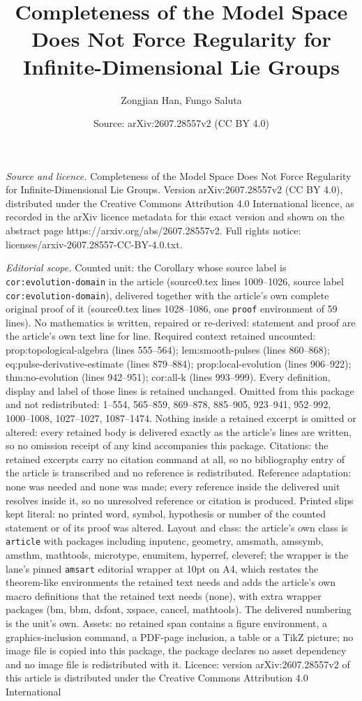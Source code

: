 \documentclass[10pt,a4paper]{amsart}
\title[Completeness of the Model Space Does Not Force Regularity fo]{Completeness of the Model Space Does Not Force Regularity for Infinite-Dimensional Lie Groups}
\author{Zongjian Han, Fungo Saluta}
\date{Source: arXiv:2607.28557v2 (CC BY 4.0)}
\begin{document}
\maketitle

\noindent\emph{Source and licence.} Completeness of the Model Space Does Not Force Regularity for Infinite-Dimensional Lie Groups. Version arXiv:2607.28557v2 (CC BY 4.0), distributed under the Creative Commons Attribution 4.0 International licence, as recorded in the arXiv licence metadata for this exact version and shown on the abstract page https://arxiv.org/abs/2607.28557v2. Full rights notice: licenses/arxiv-2607.28557-CC-BY-4.0.txt.\par\smallskip

\noindent\textit{Editorial scope.} Counted unit: the Corollary whose source label is \texttt{cor:evolution-domain} in the article (source0.tex lines 1009--1026, source label \texttt{cor:evolution-domain}), delivered together with the article's own complete original proof of it (source0.tex lines 1028--1086, one \texttt{proof} environment of 59 lines). No mathematics is written, repaired or re-derived: statement and proof are the article's own text line for line. Required context retained uncounted: prop:topological-algebra (lines 555--564); lem:smooth-pulses (lines 860--868); eq:pulse-derivative-estimate (lines 879--884); prop:local-evolution (lines 906--922); thm:no-evolution (lines 942--951); cor:all-k (lines 993--999). Every definition, display and label of those lines is retained unchanged. Omitted from this package and not redistributed: 1--554, 565--859, 869--878, 885--905, 923--941, 952--992, 1000--1008, 1027--1027, 1087--1474. Nothing inside a retained excerpt is omitted or altered: every retained body is delivered exactly as the article's lines are written, so no omission receipt of any kind accompanies this package. Citations: the retained excerpts carry no citation command at all, so no bibliography entry of the article is transcribed and no reference is redistributed. Reference adaptation: none was needed and none was made; every reference inside the delivered unit resolves inside it, so no unresolved reference or citation is produced. Printed slips kept literal: no printed word, symbol, hypothesis or number of the counted statement or of its proof was altered. Layout and class: the article's own class is \texttt{article} with packages including inputenc, geometry, amsmath, amssymb, amsthm, mathtools, microtype, enumitem, hyperref, cleveref; the wrapper is the lane's pinned \texttt{amsart} editorial wrapper at 10pt on A4, which restates the theorem-like environments the retained text needs and adds the article's own macro definitions that the retained text needs (none), with extra wrapper packages (bm, bbm, dsfont, xspace, cancel, mathtools). The delivered numbering is the unit's own. Assets: no retained span contains a figure environment, a graphics-inclusion command, a PDF-page inclusion, a table or a TikZ picture; no image file is copied into this package, the package declares no asset dependency and no image file is redistributed with it. Licence: version arXiv:2607.28557v2 of this article is distributed under the Creative Commons Attribution 4.0 International 
\end{document}
